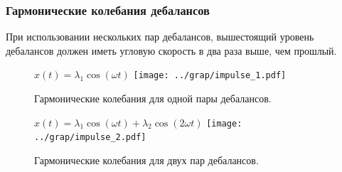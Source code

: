 \documentclass[10pt, pdf, hyperref={unicode}]{beamer}
\begin{document}
    \begin{frame}
        \frametitle{Гармонические колебания дебалансов}
        \begin{center}
            \begin{minipage}[h]{0.97\linewidth}
                При использовании нескольких пар дебалансов, вышестоящий уровень дебалансов должен иметь угловую скорость в два раза выше, чем прошлый.\\
                \newline
                \begin{minipage}[h]{0.42\linewidth}
                    \begin{figure}[h]
                        \centering
                        $x(t) = \lambda_1 \cos (\omega t)$
                        \texttt{[image: ../grap/impulse\_1.pdf]}
                        \caption{Гармонические колебания для одной пары дебалансов.}
                    \end{figure}
                \end{minipage}
                \hfill
                \begin{minipage}[h]{0.42\linewidth}
                    \begin{figure}[h]
                        \centering
                        $x(t) = \lambda_1 \cos (\omega t) + \lambda_2 \cos (2\omega t)$
                        \texttt{[image: ../grap/impulse\_2.pdf]}
                        \caption{Гармонические колебания для двух пар дебалансов.}
                    \end{figure}
                \end{minipage}
            \end{minipage}
        \end{center}
    \end{frame}
\end{document}
